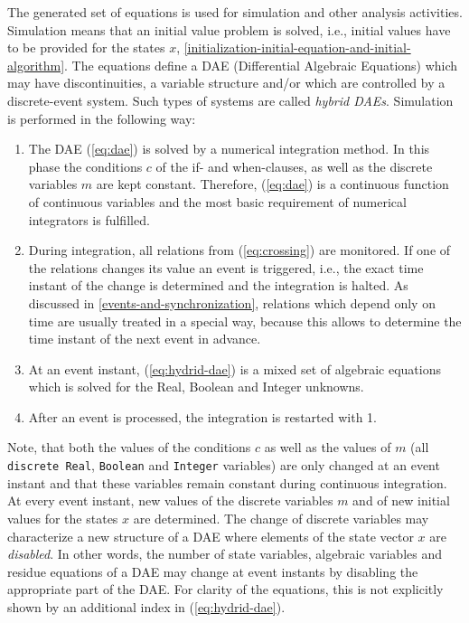 The generated set of equations is used for simulation and other analysis
activities. Simulation means that an initial value problem is solved,
i.e., initial values have to be provided for the states $x$, \cref{initialization-initial-equation-and-initial-algorithm}.
The equations define a DAE (Differential Algebraic Equations) which may
have discontinuities, a variable structure and/or which are controlled
by a discrete-event system. Such types of systems are called
\emph{hybrid DAEs}. Simulation is performed in the following way:
\begin{enumerate}
\item
  The DAE (\ref{eq:dae}) is solved by a numerical integration method. In this
  phase the conditions $c$ of the if- and when-clauses, as well as the
  discrete variables $m$ are kept constant. Therefore, (\ref{eq:dae}) is a
  continuous function of continuous variables and the most basic
  requirement of numerical integrators is fulfilled.
\item
  During integration, all relations from (\ref{eq:crossing}) are monitored. If one of
  the relations changes its value an event is triggered, i.e., the exact
  time instant of the change is determined and the integration is
  halted. As discussed in \cref{events-and-synchronization}, relations which depend only on
  time are usually treated in a special way, because this allows to
  determine the time instant of the next event in advance.
\item
  At an event instant, (\ref{eq:hydrid-dae}) is a mixed set of algebraic equations which
  is solved for the Real, Boolean and Integer unknowns.
\item
  After an event is processed, the integration is restarted with 1.
\end{enumerate}

Note, that both the values of the conditions $c$ as well as the values of
$m$ (all \lstinline!discrete Real!, \lstinline!Boolean! and \lstinline!Integer! variables) are only changed at
an event instant and that these variables remain constant during
continuous integration. At every event instant, new values of the
discrete variables $m$ and of new initial values for the states $x$ are
determined. The change of discrete variables may characterize a new
structure of a DAE where elements of the state vector $x$ are
\emph{disabled}. In other words, the number of state variables,
algebraic variables and residue equations of a DAE may change at event
instants by disabling the appropriate part of the DAE. For clarity of
the equations, this is not explicitly shown by an additional index in
(\ref{eq:hydrid-dae}).

